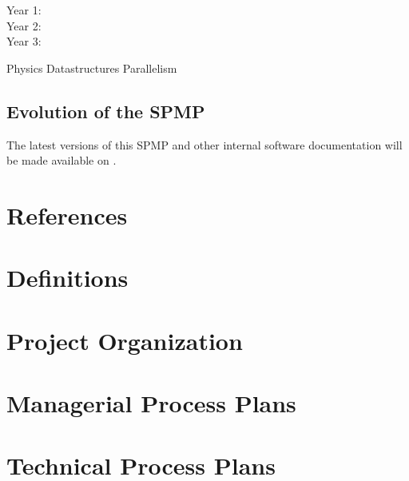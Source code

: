 \documentclass{article}[12pt]
\begin{document}
\begin{description}
\item [Year 1: ]
\item [Year 2: ]
\item [Year 3: ]
\end{description}

Physics
Datastructures
Parallelism

\subsection{Evolution of the SPMP}

The latest versions of this SPMP and other internal software
documentation will be made available on
.


\section{References} \label{s:references}


\section{Definitions} \label{s:Definitions}
\section{Project Organization} \label{s:organization}
\section{Managerial Process Plans} \label{s:managerial}
\section{Technical Process Plans} \label{s:technical}
\end{document}
